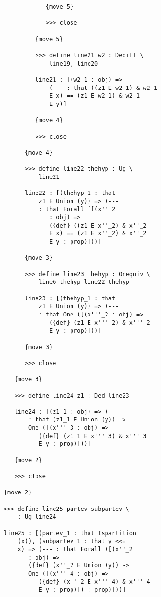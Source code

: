 \documentclass[12pt]{article}
\begin{document}
\begin{verbatim}
                  {move 5}

                  >>> close

               {move 5}

               >>> define line21 w2 : Dediff \
                   line19, line20

               line21 : [(w2_1 : obj) => 
                   (--- : that ((z1 E w2_1) & w2_1 
                   E x) == (z1 E w2_1) & w2_1 
                   E y)]

               {move 4}

               >>> close

            {move 4}

            >>> define line22 thehyp : Ug \
                line21

            line22 : [(thehyp_1 : that 
                z1 E Union (y)) => (--- 
                : that Forall ([(x''_2 
                   : obj) => 
                   ({def} ((z1 E x''_2) & x''_2 
                   E x) == (z1 E x''_2) & x''_2 
                   E y : prop)]))]

            {move 3}

            >>> define line23 thehyp : Onequiv \
                line6 thehyp line22 thehyp

            line23 : [(thehyp_1 : that 
                z1 E Union (y)) => (--- 
                : that One ([(x'''_2 : obj) => 
                   ({def} (z1 E x'''_2) & x'''_2 
                   E y : prop)]))]

            {move 3}

            >>> close

         {move 3}

         >>> define line24 z1 : Ded line23

         line24 : [(z1_1 : obj) => (--- 
             : that (z1_1 E Union (y)) -> 
             One ([(x'''_3 : obj) => 
                ({def} (z1_1 E x'''_3) & x'''_3 
                E y : prop)]))]

         {move 2}

         >>> close

      {move 2}

      >>> define line25 partev subpartev \
          : Ug line24

      line25 : [(partev_1 : that Ispartition 
          (x)), (subpartev_1 : that y <<= 
          x) => (--- : that Forall ([(x''_2 
             : obj) => 
             ({def} (x''_2 E Union (y)) -> 
             One ([(x'''_4 : obj) => 
                ({def} (x''_2 E x'''_4) & x'''_4 
                E y : prop)]) : prop)]))]


\end{verbatim}
\end{document}
